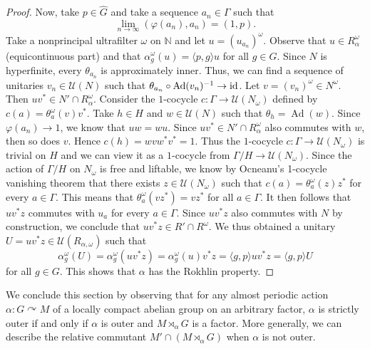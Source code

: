 \documentclass[a4paper,11pt]{amsart}
\numberwithin{equation}{section}
\theoremstyle{definition}
\newcommand{\N}{\mathbb{N}}
\newcommand{\cU}{\mathcal{U}}
\newcommand{\Ad}{\operatorname{Ad}}
\newcommand{\id}{\text{\rm id}}
\begin{document}
\begin{proof}
    Now, take $p \in \widehat{G}$ and take a sequence $a_n \in \Gamma$ such that $$\lim_{n \to \infty} (\varphi(a_n),a_n)=(1,p).$$ Take  a nonprincipal ultrafilter $\omega$ on $\N$ and let $u=(u_{a_n})^\omega$. Observe that $u \in R^\omega_\alpha$ (equicontinuous part) and that $\alpha^\omega_g(u)=\langle p,g \rangle u$ for all $g \in G$. 
    Since $N$ is hyperfinite, every $\theta_{a_n}$ is approximately inner. Thus, we can find a sequence of unitaries $v_n \in \cU(N)$ such that $\theta_{a_n} \circ \Ad(v_n)^{-1} \to \id$. Let $v=(v_n)^\omega \in N^\omega$. Then $uv^* \in N' \cap R^\omega_\alpha$. Consider the $1$-cocycle $c : \Gamma \rightarrow \cU(N_\omega)$ defined by $c(a)=\theta_a^\omega(v)v^*$. Take $h \in H$ and $w \in \cU(N)$ such that $\theta_h=\Ad(w)$. Since $\varphi(a_n) \to 1$, we know that $uw=wu$. Since $uv^* \in N' \cap R^\omega_\alpha$ also commutes with $w$, then so does $v$. Hence $c(h)=wvw^*v^*=1$. Thus the $1$-cocycle $c : \Gamma \rightarrow \cU(N_\omega)$ is trivial on $H$ and we can view it as a $1$-cocycle from $\Gamma/H \rightarrow \cU(N_\omega)$. Since the action of $\Gamma/H$ on $N_\omega$ is free and liftable, we know by Ocneanu's 1-cocycle vanishing theorem \cite[Proposition 7.2]{Oc85} that there exists $z \in \cU(N_\omega)$ such that $c(a) = \theta_a^{\omega}(z)z^*$ for every $a \in \Gamma$. This means that $\theta_a^\omega(vz^*)=vz^*$ for all $a \in \Gamma$. It then follows that $uv^*z$ commutes with $u_a$ for every $a \in \Gamma$. Since $uv^*z$ also commutes with $N$ by construction, we conclude that $uv^*z \in  R' \cap R^\omega$. We thus obtained a unitary $U=uv^*z \in \mathcal U(R_{\alpha, \omega})$ such that $$\alpha^\omega_g(U)=\alpha^\omega_g(uv^*z)=\alpha_g^\omega(u)v^*z=\langle g,p \rangle uv^*z=\langle g,p \rangle U$$
    for all $g \in G$. This shows that $\alpha$ has the Rokhlin property.
\end{proof}

We conclude this section by observing that for any almost periodic action $\alpha : G \curvearrowright M$ of a locally compact abelian group on an arbitrary factor, $\alpha$ is strictly outer if and only if $\alpha$ is outer and $M \rtimes_\alpha G$ is a factor. More generally, we can describe the relative commutant $M' \cap (M \rtimes_\alpha G)$ when $\alpha$ is not outer. 
\end{document}
